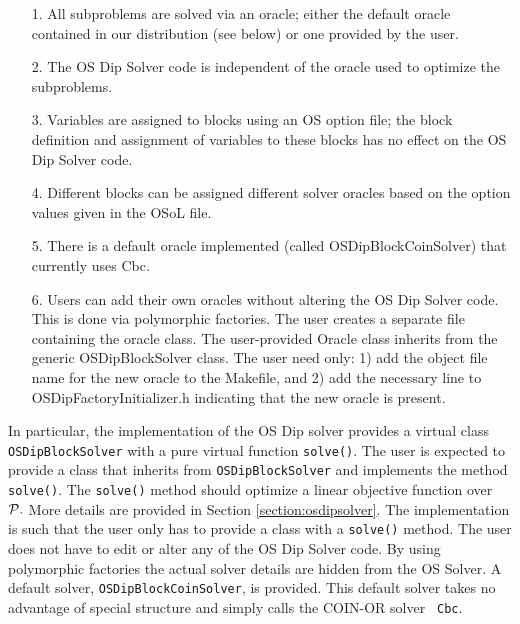\begin{itemize}
\item[1.]  All subproblems are solved via an oracle; either the default oracle
contained in our distribution (see below) or one provided by the user.

\item[2.] The OS Dip Solver code is independent of the oracle used to optimize
the subproblems.

\item[3.] Variables are assigned to blocks using an OS option file; the block
definition and  assignment of variables to these blocks has no effect on the OS
Dip Solver code.

\item[4.] Different blocks can be assigned different solver oracles based on the
option values given in the OSoL file. 

\item[5.] There is a default oracle implemented (called OSDipBlockCoinSolver)
that currently uses Cbc.

\item[6.] Users can add their own oracles without altering the OS Dip Solver
code. This is done via polymorphic factories. The user creates a separate file containing
the oracle class. The user-provided Oracle class  inherits from the generic
OSDipBlockSolver class. The user need only: 1) add the object file name for the
new oracle to the Makefile, and 2) add the necessary line to
OSDipFactoryInitializer.h indicating that the new oracle is present. 

\end{itemize}

In particular, the  implementation of the OS Dip solver provides a virtual class
{\tt OSDipBlockSolver} with a pure virtual function {\tt solve()}.  The user is
expected to provide a class that inherits from {\tt OSDipBlockSolver} and
implements the method {\tt solve()}.  The {\tt solve()} method should optimize a
linear objective function over ${\cal P}.$ More details are provided in Section
\ref{section:osdipsolver}. The implementation is such  that the user only has to
provide a class with a {\tt solve()} method. The user does not have to edit or alter 
any of the OS Dip Solver code.
By using polymorphic factories the actual solver details are hidden from the OS
Solver.  A default solver, {\tt OSDipBlockCoinSolver}, is provided. This default
solver takes no advantage of special structure and simply calls the COIN-OR solver {\tt
Cbc}.
 


